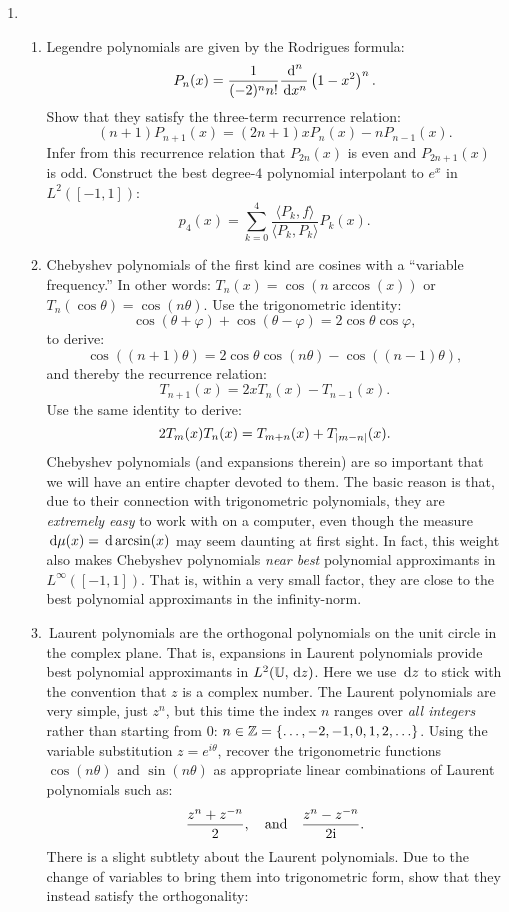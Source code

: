 \documentclass[11pt,letterpaper]{article}
\begin{document}
\begin{enumerate}
\item \begin{enumerate}
\item Legendre polynomials are given by the Rodrigues formula:
\[
P_n(x) = \dfrac{1}{(-2)^nn!}\dfrac{{\rm\,d}^n}{{\rm\,d} x^n}\left(1-x^2\right)^n.
\]
Show that they satisfy the three-term recurrence relation:
\[
(n+1)P_{n+1}(x) = (2n+1)xP_n(x) - nP_{n-1}(x).
\]
Infer from this recurrence relation that $P_{2n}(x)$ is even and $P_{2n+1}(x)$ is odd. Construct the best degree-$4$ polynomial interpolant to $e^x$ in $L^2([-1,1])$:
\[
p_4(x) = \sum_{k=0}^4 \dfrac{\langle P_k,f\rangle}{\langle P_k,P_k\rangle}P_k(x).
\]
\item Chebyshev polynomials of the first kind are cosines with a ``variable frequency.'' In other words: $T_n(x) = \cos(n\arccos(x))$ or $T_n(\cos\theta) = \cos(n\theta)$. Use the trigonometric identity:
\[
\cos(\theta+\varphi) + \cos(\theta-\varphi) = 2\cos\theta \cos\varphi,
\]
to derive:
\[
\cos((n+1)\theta) = 2\cos\theta \cos(n\theta) - \cos((n-1)\theta),
\]
and thereby the recurrence relation:
\[
T_{n+1}(x) = 2xT_n(x) - T_{n-1}(x).
\]
Use the same identity to derive:
\[
2T_m(x)T_n(x) = T_{m+n}(x) + T_{\left|{m-n}\right|}(x).
\]
Chebyshev polynomials (and expansions therein) are so important that we will have an entire chapter devoted to them. The basic reason is that, due to their connection with trigonometric polynomials, they are {\em extremely easy} to work with on a computer, even though the measure ${\rm\,d}\mu(x) = {\rm\,d} \arcsin(x)$ may seem daunting at first sight. In fact, this weight also makes Chebyshev polynomials {\em near best} polynomial approximants in $L^\infty([-1,1])$. That is, within a very small factor, they are close to the best polynomial approximants in the infinity-norm.
\item\, Laurent polynomials are the orthogonal polynomials on the unit circle in the complex plane. That is, expansions in Laurent polynomials provide best polynomial approximants in $L^2(\mathbb{U},{\rm\,d} z)$. Here we use ${\rm\,d} z$ to stick with the convention that $z$ is a complex number. The Laurent polynomials are very simple, just $z^n$, but this time the index $n$ ranges over {\em all integers} rather than starting from $0$: $n\in\mathbb{Z} = \{\ldots,-2,-1,0,1,2,\ldots\}$. Using the variable substitution $z = e^{i\theta}$, recover the trigonometric functions $\cos(n\theta)$ and $\sin(n\theta)$ as appropriate linear combinations of Laurent polynomials such as:
\[
\dfrac{z^{n}+z^{-n}}{2},\quad{\rm and}\quad\dfrac{z^{n}-z^{-n}}{2{\rm i}}.
\]
There is a slight subtlety about the Laurent polynomials. Due to the change of variables to bring them into trigonometric form, show that they instead satisfy the orthogonality:

\end{enumerate}
\end{enumerate}
\end{document}
